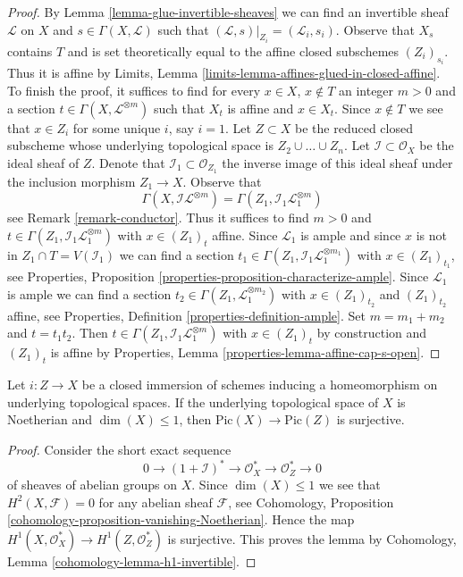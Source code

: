 \begin{proof}
\medskip\noindent
By Lemma \ref{lemma-glue-invertible-sheaves} we can find an invertible sheaf
$\mathcal{L}$ on $X$ and $s \in \Gamma(X, \mathcal{L})$
such that $(\mathcal{L}, s)|_{Z_i} = (\mathcal{L}_i, s_i)$.
Observe that $X_s$ contains $T$ and is set theoretically equal
to the affine closed subschemes $(Z_i)_{s_i}$. Thus it is affine by
Limits, Lemma \ref{limits-lemma-affines-glued-in-closed-affine}.
To finish the proof, it suffices to find for every $x \in X$, $x \not \in T$
an integer $m > 0$ and a section $t \in \Gamma(X, \mathcal{L}^{\otimes m})$
such that $X_t$ is affine and $x \in X_t$. Since $x \not \in T$
we see that $x \in Z_i$ for some unique $i$, say $i = 1$.
Let $Z \subset X$ be the reduced closed subscheme whose underlying
topological space is $Z_2 \cup \ldots \cup Z_n$.
Let $\mathcal{I} \subset \mathcal{O}_X$ be the ideal
sheaf of $Z$. Denote that $\mathcal{I}_1 \subset \mathcal{O}_{Z_1}$
the inverse image of this ideal sheaf under the inclusion
morphism $Z_1 \to X$. Observe that
$$
\Gamma(X, \mathcal{I}\mathcal{L}^{\otimes m}) =
\Gamma(Z_1, \mathcal{I}_1 \mathcal{L}_1^{\otimes m})
$$
see Remark \ref{remark-conductor}. Thus it suffices to find $m > 0$
and $t \in \Gamma(Z_1, \mathcal{I}_1 \mathcal{L}_1^{\otimes m})$
with $x \in (Z_1)_t$ affine. Since $\mathcal{L}_1$ is ample
and since $x$ is not in $Z_1 \cap T = V(\mathcal{I}_1)$
we can find a section
$t_1 \in \Gamma(Z_1, \mathcal{I}_1 \mathcal{L}_1^{\otimes m_1})$
with $x \in (Z_1)_{t_1}$, see Properties, Proposition
\ref{properties-proposition-characterize-ample}.
Since $\mathcal{L}_1$ is ample we can find a section
$t_2 \in \Gamma(Z_1, \mathcal{L}_1^{\otimes m_2})$
with $x \in (Z_1)_{t_2}$ and $(Z_1)_{t_2}$ affine, see
Properties, Definition \ref{properties-definition-ample}.
Set $m = m_1 + m_2$ and $t = t_1 t_2$. Then
$t \in \Gamma(Z_1, \mathcal{I}_1 \mathcal{L}_1^{\otimes m})$
with $x \in (Z_1)_t$ by construction and
$(Z_1)_t$ is affine by Properties, Lemma
\ref{properties-lemma-affine-cap-s-open}.
\end{proof}

\begin{lemma}
\label{lemma-lift-line-bundle-from-reduction-dimension-1}
Let $i : Z \to X$ be a closed immersion of schemes
inducing a homeomorphism on underlying topological spaces.
If the underlying topological space of $X$ is Noetherian and
$\dim(X) \leq 1$, then $\text{Pic}(X) \to \text{Pic}(Z)$ is surjective.
\end{lemma}

\begin{proof}
Consider the short exact sequence
$$
0 \to (1 + \mathcal{I})^* \to \mathcal{O}^*_X \to \mathcal{O}^*_Z \to 0
$$
of sheaves of abelian groups on $X$. Since $\dim(X) \leq 1$ we see that
$H^2(X, \mathcal{F}) = 0$ for any abelian sheaf $\mathcal{F}$, see
Cohomology, Proposition \ref{cohomology-proposition-vanishing-Noetherian}.
Hence the map $H^1(X, \mathcal{O}^*_X) \to H^1(Z, \mathcal{O}_Z^*)$
is surjective. This proves the lemma by
Cohomology, Lemma \ref{cohomology-lemma-h1-invertible}.
\end{proof}

